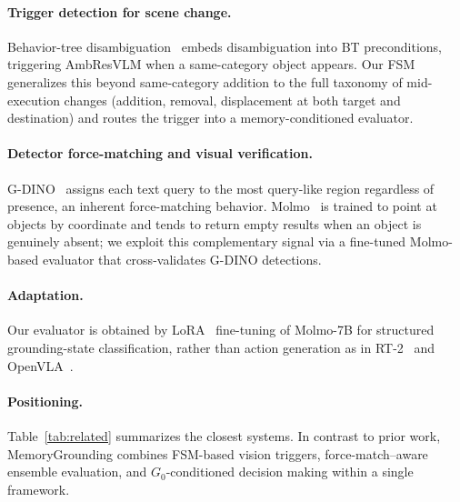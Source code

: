 \documentclass{article}
\begin{document}
\paragraph{Trigger detection for scene change.}
Behavior-tree disambiguation~\cite{btdisambig} embeds disambiguation
into BT preconditions, triggering AmbResVLM when a same-category object
appears. Our FSM generalizes this beyond same-category addition to the
full taxonomy of mid-execution changes (addition, removal, displacement
at both target and destination) and routes the trigger into a
memory-conditioned evaluator.

\paragraph{Detector force-matching and visual verification.}
G-DINO~\cite{gdino} assigns each text query to the most query-like
region regardless of presence, an inherent force-matching behavior.
Molmo~\cite{molmo} is trained to point at objects by coordinate and
tends to return empty results when an object is genuinely absent; we
exploit this complementary signal via a fine-tuned Molmo-based evaluator
that cross-validates G-DINO detections.

\paragraph{Adaptation.}
Our evaluator is obtained by LoRA~\cite{lora} fine-tuning of Molmo-7B
for structured grounding-state classification, rather than action
generation as in RT-2~\cite{rt2} and OpenVLA~\cite{openvla}.

\paragraph{Positioning.}
Table~\ref{tab:related} summarizes the closest systems. In contrast to
prior work, MemoryGrounding combines FSM-based vision triggers,
force-match--aware ensemble evaluation, and $G_0$-conditioned decision
making within a single framework.
\end{document}

